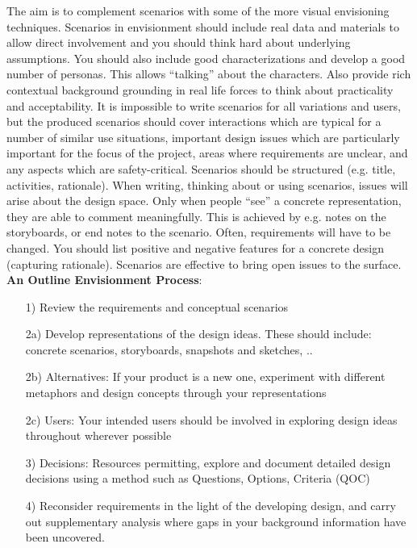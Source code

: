 The aim is to complement scenarios with some of the more visual envisioning techniques. Scenarios in envisionment should include real data and materials to allow direct involvement and you should think hard about underlying assumptions. You should also include good characterizations and develop a good number of personas. This allows ``talking'' about the characters. Also provide rich contextual background grounding in real life forces to think about practicality and acceptability. It is impossible to write scenarios for all variations and users, but the produced scenarios should cover interactions which are typical for a number of similar use situations, important design issues which are particularly important for the focus of the project, areas where requirements are unclear, and any aspects which are safety-critical. Scenarios should be structured (e.g. title, activities, rationale). When writing, thinking about or using scenarios, issues will arise about the design space. Only when people ``see'' a concrete representation, they are able to comment meaningfully. This is achieved by e.g. notes on the storyboards, or end notes to the scenario. Often, requirements will have to be changed. You should list positive and negative features for a concrete design (capturing rationale). Scenarios are effective to bring open issues to the surface.\\
\textbf{An Outline Envisionment Process}:
\begin{itemize}
\item[1)] Review the requirements and conceptual scenarios
\item[2a)] Develop representations of the design ideas. These should include: concrete scenarios, storyboards, snapshots and sketches, ..
\item[2b)] Alternatives: If your product is a new one, experiment with different metaphors and design concepts through your representations
\item[2c)] Users: Your intended users should be involved in exploring design ideas throughout wherever possible
\item[3)] Decisions: Resources permitting, explore and document detailed design decisions using a method such as Questions, Options, Criteria (QOC)
\item[4)] Reconsider requirements in the light of the developing design, and carry out supplementary analysis where gaps in your background information have been uncovered.
\end{itemize}
